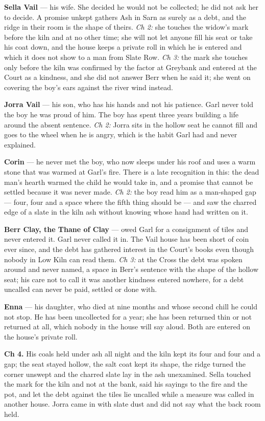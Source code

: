 \documentclass{design/chronicle}
\begin{document}
{
\textbf{Sella Vail} — his wife. She decided he would not be collected; he did not ask her to decide. A promise unkept gathers Ash in Sarn as surely as a debt, and the ridge in their room is the shape of theirs. \emph{Ch 2:} she touches the widow’s mark before the kiln and at no other time; she will not let anyone fill his seat or take his coat down, and the house keeps a private roll in which he is entered and which it does not show to a man from Slate Row. \emph{Ch 3:} the mark she touches only before the kiln was confirmed by the factor at Greybank and entered at the Court as a kindness, and she did not answer Berr when he said it; she went on covering the boy’s ears against the river wind instead.

\textbf{Jorra Vail} — his son, who has his hands and not his patience. Garl never told the boy he was proud of him. The boy has spent three years building a life around the absent sentence. \emph{Ch 2:} Jorra sits in the hollow seat he cannot fill and goes to the wheel when he is angry, which is the habit Garl had and never explained.

\textbf{Corin} — he never met the boy, who now sleeps under his roof and uses a warm stone that was warmed at Garl’s fire. There is a late recognition in this: the dead man’s hearth warmed the child he would take in, and a promise that cannot be settled because it was never made. \emph{Ch 2:} the boy read him as a man-shaped gap --- four, four and a space where the fifth thing should be --- and saw the charred edge of a slate in the kiln ash without knowing whose hand had written on it.

\textbf{Berr Clay, the Thane of Clay} — owed Garl for a consignment of tiles and never entered it. Garl never called it in. The Vail house has been short of coin ever since, and the debt has gathered interest in the Court’s books even though nobody in Low Kiln can read them. \emph{Ch 3:} at the Cross the debt was spoken around and never named, a space in Berr’s sentence with the shape of the hollow seat; his care not to call it was another kindness entered nowhere, for a debt uncalled can never be paid, settled or done with.

\textbf{Enna} — his daughter, who died at nine months and whose second chill he could not stop. He has been uncollected for a year; she has been returned thin or not returned at all, which nobody in the house will say aloud. Both are entered on the house’s private roll.

\textbf{Ch 4.} His coals held under ash all night and the kiln kept its four and four and a gap; the seat stayed hollow, the salt coat kept its shape, the ridge turned the corner unswept and the charred slate lay in the ash unexamined. Sella touched the mark for the kiln and not at the bank, said his sayings to the fire and the pot, and let the debt against the tiles lie uncalled while a measure was called in another house. Jorra came in with slate dust and did not say what the back room held.

}
\end{document}
